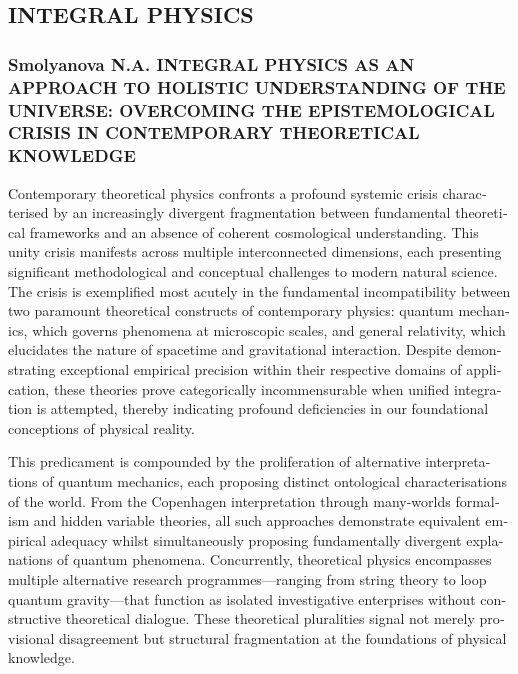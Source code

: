 \ifprintabstract
    \begin{english}
    \subsection{INTEGRAL PHYSICS}
    \label{subsec:smolyanova-en}

    \subsubsection{Smolyanova N.A. INTEGRAL PHYSICS AS AN APPROACH TO HOLISTIC UNDERSTANDING OF THE UNIVERSE: OVERCOMING THE EPISTEMOLOGICAL CRISIS IN CONTEMPORARY THEORETICAL KNOWLEDGE}
    \label{subsubsec:smolyanova-title-en}

    Contemporary theoretical physics confronts a profound systemic crisis characterised by an increasingly divergent fragmentation between fundamental theoretical frameworks and an absence of coherent cosmological understanding. This unity crisis manifests across multiple interconnected dimensions, each presenting significant methodological and conceptual challenges to modern natural science. The crisis is exemplified most acutely in the fundamental incompatibility between two paramount theoretical constructs of contemporary physics: quantum mechanics, which governs phenomena at microscopic scales, and general relativity, which elucidates the nature of spacetime and gravitational interaction. Despite demonstrating exceptional empirical precision within their respective domains of application, these theories prove categorically incommensurable when unified integration is attempted, thereby indicating profound deficiencies in our foundational conceptions of physical reality.

    This predicament is compounded by the proliferation of alternative interpretations of quantum mechanics, each proposing distinct ontological characterisations of the world. From the Copenhagen interpretation through many-worlds formalism and hidden variable theories, all such approaches demonstrate equivalent empirical adequacy whilst simultaneously proposing fundamentally divergent explanations of quantum phenomena. Concurrently, theoretical physics encompasses multiple alternative research programmes—ranging from string theory to loop quantum gravity—that function as isolated investigative enterprises without constructive theoretical dialogue. These theoretical pluralities signal not merely provisional disagreement but structural fragmentation at the foundations of physical knowledge.


\end{english}

